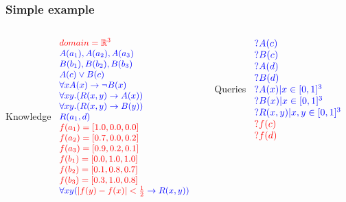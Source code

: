 \documentclass[xcolor=pdftex,dvipsnames,table]{beamer}
\def\R{\mathbb{R}}
\begin{document}
\begin{frame}
  \frametitle{Simple example}
\begin{columns}
  \begin{column}[t]{0.5\textwidth}
    \begin{block}{Knowledge}
      $\small 
      \begin{array}{l}
        \color{red} domain = \R^3 \\
        \color{blue}  A(a_1), A(a_2), A(a_3) \\
        \color{blue}  B(b_1), B(b_2), B(b_3) \\
        \color{blue}  A(c) \vee B(c) \\
        \color{blue} \forall x A(x)\rightarrow \neg B(x) \\
        \color{blue} \forall xy.(R(x,y) \rightarrow A(x)) \\
        \color{blue} \forall xy.(R(x,y) \rightarrow B(y)) \\
        \color{blue} R(a_1,d) \\
        \color{red}f(a_1)  = [1.0,0.0,0.0] \\
        \color{red}f(a_2)  = [0.7,0.0,0.2] \\
        \color{red}f(a_3)  = [0.9,0.2,0.1] \\
        \color{red}f(b_1) = [0.0,1.0,1.0] \\
        \color{red}f(b_2) = [0.1,0.8,0.7]\\
        \color{red}f(b_3) = [0.3,1.0,0.8] \\
        \color{blue}\forall x y ({\color{red} |f(y) - f(x)| <
        \frac{1}{2}} \rightarrow R(x,y))
      \end{array}
      $
    \end{block}
  \end{column}
    \begin{column}[t]{0.45\textwidth}
      \begin{alertblock}{\color{white}Queries}
        $
        \begin{array}{l}
          \color{blue} ? A(c) \\
          \color{blue}? B(c) \\
          \color{blue}? A(d) \\
          \color{blue}? B(d) \\
          \color{blue} ? A(x) | x \in [0,1]^3 \\
          \color{blue} ? B(x) | x \in [0,1]^3 \\
          \color{blue} ? R(x,y) | x,y \in [0,1]^3 \\
          \color{red}? f(c) \\
          \color{red}? f(d) \\
        \end{array}
        $
      \end{alertblock}
    \end{column}
  \end{columns}
\end{frame}  
\end{document}
